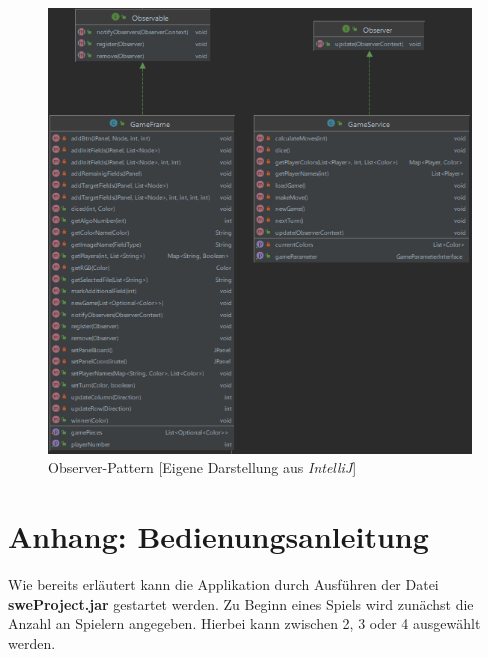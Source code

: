 \begin{figure}[htbp]
\centering
\centerline{\includegraphics[scale=.7]{observer}}
\caption{Observer-Pattern [Eigene Darstellung aus \emph{IntelliJ}]}
\label{fig:oberver}
\end{figure}

\newpage
\titlespacing*{\chapter}{0pt}{-30mm}{10pt}
  
\chapter{Anhang: Bedienungsanleitung}
\label{ch:anleitung}
\pagestyle{scrheadings}
\clearscrheadfoot
{}
\setcounter{page}{41}
\ofoot[\pagemark]{\pagemark}
\onehalfspacing

\noindent Wie bereits erläutert kann die Applikation durch Ausführen der Datei \textbf{\texttt{}{sweProject.jar}} gestartet werden. Zu Beginn eines Spiels wird zunächst die Anzahl an Spielern angegeben. Hierbei kann zwischen 2, 3 oder 4 ausgewählt werden.

